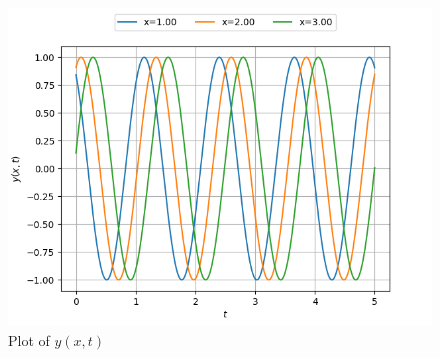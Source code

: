 \documentclass[journal,12pt,twocolumn]{IEEEtran}
\theoremstyle{remark}
\begin{document}
\begin{figure}[htbp]
	\includegraphics[width=\columnwidth]{figs/plot.png}
	\caption{Plot of $y(x,t)$}
	\label{fig:plot_bm_28}
\end{figure}
\end{document}
